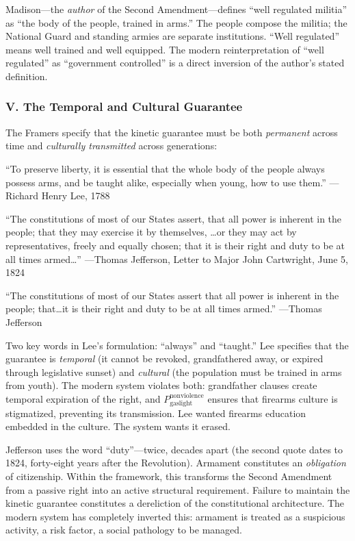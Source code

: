 Madison---the \textit{author} of the Second Amendment---defines ``well regulated militia'' as ``the body of the people, trained in arms.'' The people compose the militia; the National Guard and standing armies are separate institutions. ``Well regulated'' means well trained and well equipped. The modern reinterpretation of ``well regulated'' as ``government controlled'' is a direct inversion of the author's stated definition.

\subsubsection*{V. The Temporal and Cultural Guarantee}

The Framers specify that the kinetic guarantee must be both \textit{permanent} across time and \textit{culturally transmitted} across generations:

\begin{historicalsource}
``To preserve liberty, it is essential that the whole body of the people always possess arms, and be taught alike, especially when young, how to use them.'' \hfill ---Richard Henry Lee, 1788

\medskip
``The constitutions of most of our States assert, that all power is inherent in the people; that they may exercise it by themselves, \ldots or they may act by representatives, freely and equally chosen; that it is their right and duty to be at all times armed\ldots'' \hfill ---Thomas Jefferson, Letter to Major John Cartwright, June 5, 1824

\medskip
``The constitutions of most of our States assert that all power is inherent in the people; that\ldots it is their right and duty to be at all times armed.'' \hfill ---Thomas Jefferson
\end{historicalsource}

Two key words in Lee's formulation: ``always'' and ``taught.'' Lee specifies that the guarantee is \textit{temporal} (it cannot be revoked, grandfathered away, or expired through legislative sunset) and \textit{cultural} (the population must be trained in arms from youth). The modern system violates both: grandfather clauses create temporal expiration of the right, and $P_{\text{gaslight}}^{\text{nonviolence}}$ ensures that firearms culture is stigmatized, preventing its transmission. Lee wanted firearms education embedded in the culture. The system wants it erased.

Jefferson uses the word ``duty''---twice, decades apart (the second quote dates to 1824, forty-eight years after the Revolution). Armament constitutes an \textit{obligation} of citizenship. Within the framework, this transforms the Second Amendment from a passive right into an active structural requirement. Failure to maintain the kinetic guarantee constitutes a dereliction of the constitutional architecture. The modern system has completely inverted this: armament is treated as a suspicious activity, a risk factor, a social pathology to be managed.

